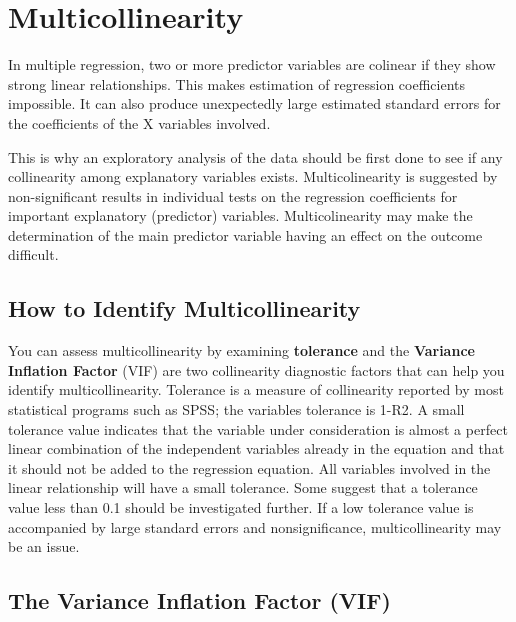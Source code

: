 \documentclass[a4paper,12pt]{article}
\begin{document}

\newpage
\section{Multicollinearity}
In multiple regression, two or more predictor variables are colinear if they show strong linear relationships. This makes estimation of regression coefficients impossible. It can also produce unexpectedly large estimated standard errors for the coefficients of the X variables involved.

This is why an exploratory analysis of the data should be first done to see if any collinearity among explanatory variables exists. Multicolinearity is suggested by non-significant results in individual tests on the regression coefficients for important explanatory (predictor) variables. Multicolinearity may make the determination of the main predictor variable having an effect on the outcome difficult.

\subsection{How to Identify Multicollinearity}


You can assess multicollinearity by examining \textbf{tolerance} and the \textbf{Variance Inflation Factor} (VIF) are two collinearity diagnostic factors that can help you identify multicollinearity. Tolerance is a measure of collinearity reported by most statistical programs such as SPSS; the variables tolerance is 1-R2. A small tolerance value indicates that the variable under consideration is almost a perfect linear combination of the independent variables already in the equation and that it should not be added to the regression equation. All variables involved in the linear relationship will have a small tolerance. Some suggest that a tolerance value less than 0.1 should be investigated further. If a low tolerance value is accompanied by large standard errors and nonsignificance, multicollinearity may be an issue.



\subsection{The Variance Inflation Factor (VIF)}
\end{document}
